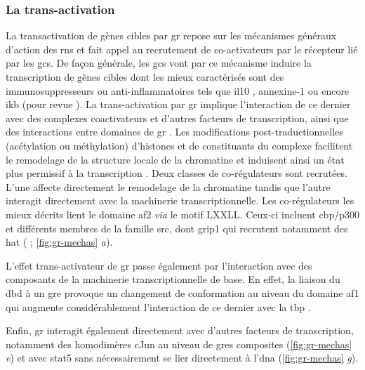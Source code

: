 \documentclass[../main.tex]{subfiles}
\begin{document}
\subsubsection{La trans-activation}
La transactivation de gènes cibles par \gls{gr} repose sur les mécanismes généraux d'action des \glspl{rn} et fait appel au recrutement de co-activateurs par le récepteur lié par les \glspl{gc}.
De façon générale, les \glspl{gc} vont par ce mécanisme induire la transcription de gènes cibles dont les mieux caractérisés sont des immunosuppresseurs ou anti-inflammatoires tels que \gls{il10} \citep{Mozo2004}, annexine-1 \citep{Philip1997} ou encore \gls{ikb} \citep{Auphan1995} (pour revue \citealp{Newton2000}).
La trans-activation par \gls{gr} implique l'interaction de ce dernier avec des complexes coactivateurs et d'autres facteurs de transcription, ainsi que des interactions entre domaines de \gls{gr} \citep{Bledsoe2002,Kumar2005}.
Les modifications post-traductionnelles (acétylation ou méthylation) d'histones et de constituants du complexe facilitent le remodelage de la structure locale de la chromatine et induisent ainsi un état plus permissif à la transcription \citep{Aranda2001}.
Deux classes de co-régulateurs sont recrutées.
L'une affecte directement le remodelage de la chromatine tandis que l'autre interagit directement avec la machinerie transcriptionnelle.
Les co-régulateurs les mieux décrits lient le domaine \gls{af2} \textit{via} le motif LXXLL.
Ceux-ci incluent \gls{cbp}/p300 et différents membres de la famille \gls{src}, dont \gls{grip1} qui recrutent notamment des \gls{hat} (\citep{Fryer1998} ; \autoref{fig:gr-mechas} \textit{a}).



L'effet trans-activateur de \gls{gr} passe également par l'interaction avec des composants de la machinerie transcriptionnelle de base.
En effet, la liaison du \gls{dbd} à un \gls{gre} provoque un changement de conformation au niveau du domaine \gls{af1} qui augmente considérablement l'interaction de ce dernier avec la \gls{tbp} \citep{Kumar2004}.
\par
Enfin, \gls{gr} interagit également directement avec d'autres facteurs de transcription, notamment des homodimères cJun au niveau de \glspl{gre} composites (\autoref{fig:gr-mechas} \textit{e}) et avec \gls{stat5} \citep{Stoecklin1997} sans nécessairement se lier directement à l'\gls{dna} (\autoref{fig:gr-mechas} \textit{g}).
\end{document}
